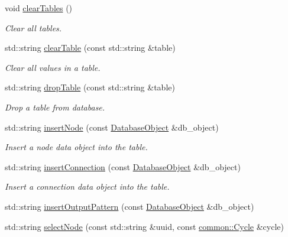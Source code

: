 \begin{DoxyCompactItemize}
void \hyperlink{classcryomesh_1_1manager_1_1DatabaseManager_ad59a62d4e7a3dee8bb04ed5cbd579efb}{clear\-Tables} ()
\begin{DoxyCompactList}\small\item\em \-Clear all tables. \end{DoxyCompactList}\item 
std\-::string \hyperlink{classcryomesh_1_1manager_1_1DatabaseManager_aa7265c2234d74d2931281ecb5cda83db}{clear\-Table} (const std\-::string \&table)
\begin{DoxyCompactList}\small\item\em \-Clear all values in a table. \end{DoxyCompactList}\item 
std\-::string \hyperlink{classcryomesh_1_1manager_1_1DatabaseManager_a93a9f35b55d065f82df536c228c75a2d}{drop\-Table} (const std\-::string \&table)
\begin{DoxyCompactList}\small\item\em \-Drop a table from database. \end{DoxyCompactList}\item 
std\-::string \hyperlink{classcryomesh_1_1manager_1_1DatabaseManager_a74b282e11bd8c59a1e620b89cfe95ab2}{insert\-Node} (const \hyperlink{classcryomesh_1_1manager_1_1DatabaseObject}{\-Database\-Object} \&db\-\_\-object)
\begin{DoxyCompactList}\small\item\em \-Insert a node data object into the table. \end{DoxyCompactList}\item 
std\-::string \hyperlink{classcryomesh_1_1manager_1_1DatabaseManager_a0e5eaf4c78e61a54e9ead0148d7e8851}{insert\-Connection} (const \hyperlink{classcryomesh_1_1manager_1_1DatabaseObject}{\-Database\-Object} \&db\-\_\-object)
\begin{DoxyCompactList}\small\item\em \-Insert a connection data object into the table. \end{DoxyCompactList}\item 
std\-::string \hyperlink{classcryomesh_1_1manager_1_1DatabaseManager_a48308f572e1d87a7f44e1e9fbeaf132b}{insert\-Output\-Pattern} (const \hyperlink{classcryomesh_1_1manager_1_1DatabaseObject}{\-Database\-Object} \&db\-\_\-object)
\item 
std\-::string \hyperlink{classcryomesh_1_1manager_1_1DatabaseManager_a72e0ced2c0638556f66cbceb60123aa5}{select\-Node} (const std\-::string \&uuid, const \hyperlink{classcryomesh_1_1common_1_1Cycle}{common\-::\-Cycle} \&cycle)

\end{DoxyCompactItemize}

